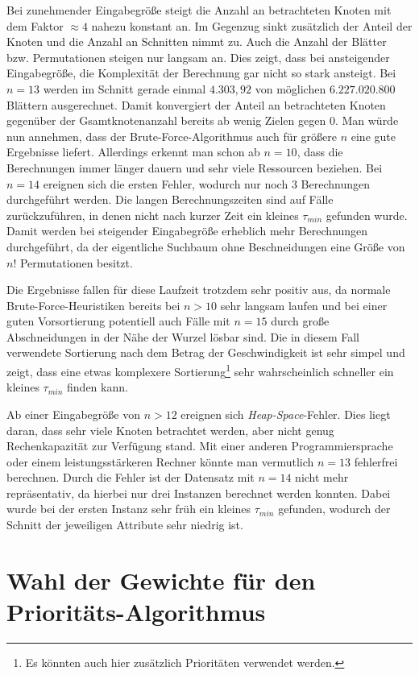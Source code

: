 \documentclass[german,version-2019-11]{uzl-thesis}
\begin{document}
Bei zunehmender Eingabegröße steigt die Anzahl an betrachteten Knoten mit dem Faktor $\approx 4$ nahezu konstant an. Im Gegenzug sinkt zusätzlich der Anteil der Knoten und die Anzahl an Schnitten nimmt zu. Auch die Anzahl der Blätter bzw. Permutationen steigen nur langsam an. Dies zeigt, dass bei ansteigender Eingabegröße, die Komplexität der Berechnung gar nicht so stark ansteigt. Bei $n=13$ werden im Schnitt gerade einmal $4.303,92$ von möglichen $6.227.020.800$ Blättern ausgerechnet. Damit konvergiert der Anteil an betrachteten Knoten gegenüber der Gsamtknotenanzahl bereits ab wenig Zielen gegen $0$. Man würde nun annehmen, dass der Brute-Force-Algorithmus auch für größere $n$ eine gute Ergebnisse liefert. Allerdings erkennt man schon ab $n=10$, dass die Berechnungen immer länger dauern und sehr viele Ressourcen beziehen. Bei $n=14$ ereignen sich die ersten Fehler, wodurch nur noch $3$ Berechnungen durchgeführt werden. Die langen Berechnungszeiten sind auf Fälle zurückzuführen, in denen nicht nach kurzer Zeit ein kleines $\tau_{min}$ gefunden wurde. Damit werden bei steigender Eingabegröße erheblich mehr Berechnungen durchgeführt, da der eigentliche Suchbaum ohne Beschneidungen eine Größe von $n!$ Permutationen besitzt.  

Die Ergebnisse fallen für diese Laufzeit trotzdem sehr positiv aus, da normale Brute-Force-Heuristiken bereits bei $n>10$ sehr langsam laufen und bei einer guten Vorsortierung potentiell auch Fälle mit $n=15$ durch große Abschneidungen in der Nähe der Wurzel lösbar sind. Die in diesem Fall verwendete Sortierung nach dem Betrag der Geschwindigkeit ist sehr simpel und zeigt, dass eine etwas komplexere Sortierung\footnote{Es könnten auch hier zusätzlich Prioritäten verwendet werden.} sehr wahrscheinlich schneller ein kleines $\tau_{min}$ finden kann. 

Ab einer Eingabegröße von $n>12$ ereignen sich \emph{Heap-Space}-Fehler. Dies liegt daran, dass sehr viele Knoten betrachtet werden, aber nicht genug Rechenkapazität zur Verfügung stand. Mit einer anderen Programmiersprache oder einem leistungsstärkeren Rechner könnte man vermutlich $n=13$ fehlerfrei berechnen. Durch die Fehler ist der Datensatz mit $n=14$ nicht mehr repräsentativ, da hierbei nur drei Instanzen berechnet werden konnten. Dabei wurde bei der ersten Instanz sehr früh ein kleines $\tau_{min}$ gefunden, wodurch der Schnitt der jeweiligen Attribute sehr niedrig ist.   

\section{Wahl der Gewichte für den Prioritäts-Algorithmus}
\label{kap5:gewichte}
\end{document}
